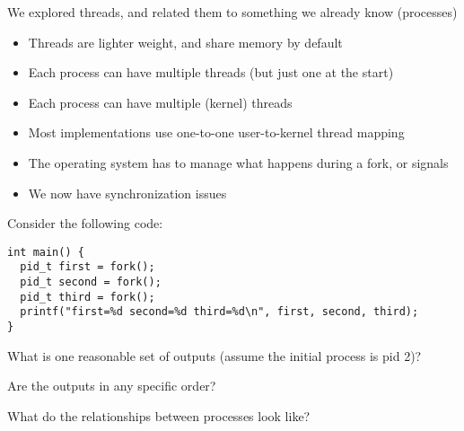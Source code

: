   \begin{slide}


    We explored threads, and related them to something we already know (processes)
    \begin{itemize}
      \item Threads are lighter weight, and share memory by default
      \item Each process can have multiple threads (but just one at the start)
    \end{itemize}

  \end{slide}

  \begin{slide}


    \begin{itemize}
      \item Each process can have multiple (kernel) threads
      \item Most implementations use one-to-one user-to-kernel thread mapping
      \item The operating system has to manage what happens during a fork, or signals
      \item We now have synchronization issues
    \end{itemize}

  \end{slide}

  \begin{slide}


    Consider the following code:

    \begin{verbatim}
int main() {
  pid_t first = fork();
  pid_t second = fork();
  pid_t third = fork();
  printf("first=%d second=%d third=%d\n", first, second, third);
}
    \end{verbatim}
    \vspace{1em}

    What is one reasonable set of outputs (assume the initial process is pid 2)?
    \medskip

    Are the outputs in any specific order?
    \medskip

    What do the relationships between processes look like?

  \end{slide}


